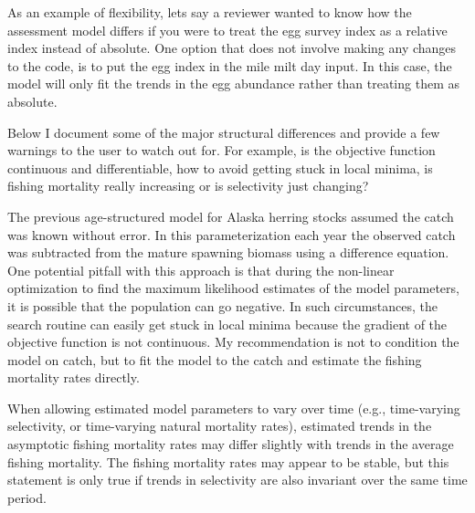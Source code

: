 \documentclass[12pt,letterpaper]{article}
\begin{document}
  As an example of flexibility, lets say a reviewer wanted to know how the assessment model differs if you were to treat the egg survey index as a relative index instead of absolute. One option that does not involve making any changes to the code, is to put the egg index in the mile milt day input.  In this case, the model will only fit the trends in the egg abundance rather than treating them as absolute.

  Below I document some of the major structural differences and provide a few warnings to the user to watch out for.  For example, is the objective function continuous and differentiable, how to avoid getting stuck in local minima, is fishing mortality really increasing or is selectivity just changing?

  The previous age-structured model for Alaska herring stocks assumed the catch was known without error.  In this parameterization each year the observed catch was subtracted from the mature spawning biomass using a difference equation. One potential pitfall with this approach is that during the non-linear optimization to find the maximum likelihood estimates of the model parameters, it is possible that the population can go negative.  In such circumstances, the search routine can easily get stuck in local minima because the gradient of the objective function is not continuous.  My recommendation is not to condition the model on catch, but to fit the model to the catch and estimate the fishing mortality rates directly.


  When allowing estimated model parameters to vary over time (e.g., time-varying selectivity, or time-varying natural mortality rates), estimated trends in the asymptotic fishing mortality rates may differ slightly with trends in the average fishing mortality.  The fishing mortality rates may appear to be stable, but this statement is only true if trends in selectivity are also invariant over the same time period. 

  \label{sec:summary}
  



  
  
\end{document}
